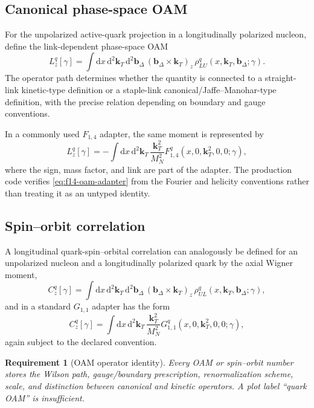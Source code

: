 \documentclass[11pt]{article}
\newtheorem{requirement}[definition]{Requirement}
\newcommand{\kT}{\bm{k}_{T}}
\newcommand{\bD}{\bm{b}_{\Delta}}
\newcommand{\dd}{\mathrm{d}}
\begin{document}
\subsection{Canonical phase-space OAM}

For the unpolarized active-quark projection in a longitudinally polarized
nucleon, define the link-dependent phase-space OAM
\begin{equation}
 L_z^q[\gamma]
 =\int\dd x\,\dd^2\kT\,\dd^2\bD\,
 (\bD\times\kT)_z\,
 \rho_{LU}^q(x,\kT,\bD;\gamma).
\label{eq:wigner-oam}
\end{equation}
The operator path determines whether the quantity is connected to a straight-
link kinetic-type definition or a staple-link canonical/Jaffe--Manohar-type
definition, with the precise relation depending on boundary and gauge
conventions.

In a commonly used \(F_{1,4}\) adapter, the same moment is represented by
\cite{LorcePasquini2011,Kanazawa2014}
\begin{equation}
 L_z^q[\gamma]
 =-\int\dd x\,\dd^2\kT\,
 \frac{\kT^2}{M_N^2}
 F_{1,4}^q(x,0,\kT^2,0,0;\gamma),
\label{eq:f14-oam-adapter}
\end{equation}
where the sign, mass factor, and link are part of the adapter.  The production
code verifies \cref{eq:f14-oam-adapter} from the Fourier and helicity
conventions rather than treating it as an untyped identity.

\subsection{Spin--orbit correlation}

A longitudinal quark-spin--orbital correlation can analogously be defined
for an unpolarized nucleon and a longitudinally polarized quark by the axial
Wigner moment,
\begin{equation}
 C_z^q[\gamma]
 =\int\dd x\,\dd^2\kT\,\dd^2\bD\,
 (\bD\times\kT)_z\,
 \rho_{UL}^q(x,\kT,\bD;\gamma),
\label{eq:spin-orbit-wigner}
\end{equation}
and in a standard \(G_{1,1}\) adapter has the form
\begin{equation}
 C_z^q[\gamma]
 =\int\dd x\,\dd^2\kT\,
 \frac{\kT^2}{M_N^2}
 G_{1,1}^q(x,0,\kT^2,0,0;\gamma),
\label{eq:g11-spin-orbit}
\end{equation}
again subject to the declared convention.

\begin{requirement}[OAM operator identity]
\label{req:oam-operator-identity}
Every OAM or spin--orbit number stores the Wilson path, gauge/boundary
prescription, renormalization scheme, scale, and distinction between
canonical and kinetic operators.  A plot label ``quark OAM'' is insufficient.
\end{requirement}
\end{document}
